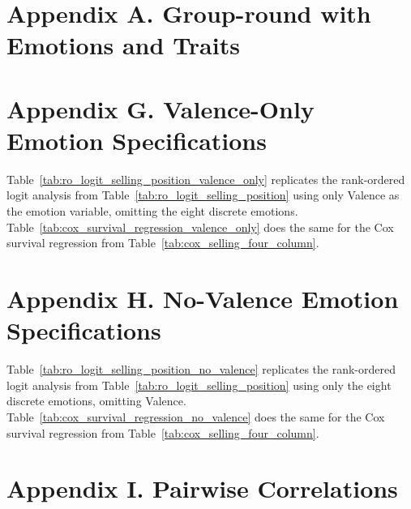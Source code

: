\documentclass[11pt]{article}
\begin{document}
\newpage

\section*{Appendix A. Group-round with Emotions and Traits}


\section*{Appendix G. Valence-Only Emotion Specifications}

Table~\ref{tab:ro_logit_selling_position_valence_only} replicates the rank-ordered logit analysis from Table~\ref{tab:ro_logit_selling_position} using only Valence as the emotion variable, omitting the eight discrete emotions. Table~\ref{tab:cox_survival_regression_valence_only} does the same for the Cox survival regression from Table~\ref{tab:cox_selling_four_column}.





\newpage

\section*{Appendix H. No-Valence Emotion Specifications}

Table~\ref{tab:ro_logit_selling_position_no_valence} replicates the rank-ordered logit analysis from Table~\ref{tab:ro_logit_selling_position} using only the eight discrete emotions, omitting Valence. Table~\ref{tab:cox_survival_regression_no_valence} does the same for the Cox survival regression from Table~\ref{tab:cox_selling_four_column}.





\newpage

\section*{Appendix I. Pairwise Correlations}

\begin{table}[H]
  \centering
  \caption{Pairwise correlations of trait measures}
  \label{tab:trait_correlations}
  
\end{table}
\end{document}

